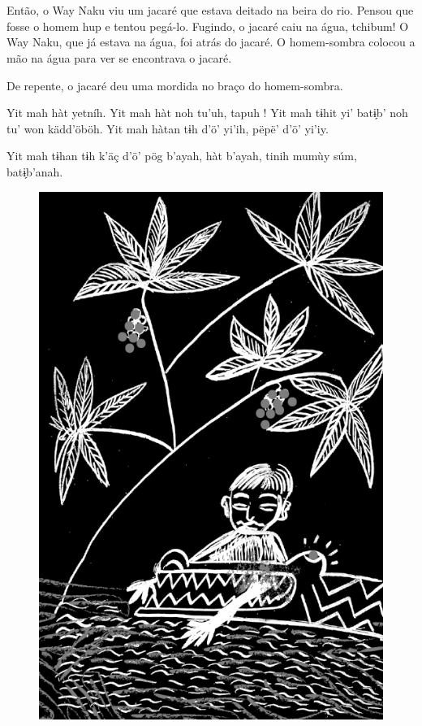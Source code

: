 \chapter*{}

\mbox{}\vspace*{\fill}

Então, o Way Naku viu um
jacaré que estava deitado
na beira do rio. Pensou
que fosse o homem hup e
tentou pegá-lo. Fugindo,
o jacaré caiu na água,
tchibum! O Way Naku,
que já estava na água,
foi atrás do jacaré. O
homem-sombra colocou a
mão na água para ver se
encontrava o jacaré.


De repente, o jacaré deu
uma mordida no braço do
homem-sombra.

\bigskip

Yit mah hàt yetníh. Yit
mah hàt noh tu’uh, tapuh !
Yit mah tɨhit yi’ batɨ̗b’ noh
tu’ won kädd’öböh. Yit
mah hàtan tɨh d’ö’ yi’ih,
pëpë’ d’ö’ yi’iy.

Yit mah tɨhan tɨh k’äç
d’ö’ pög b’ayah, hàt
b’ayah, tinih mumùy súm,
batɨ̗b’anah.

\vspace*{\fill}

\begin{figure}
\vspace*{-1.2cm}
\hspace*{-2.2cm}\includegraphics[width=138mm]{./imgs/img7.jpg}
\end{figure}

